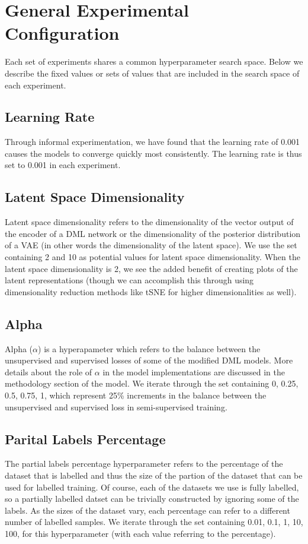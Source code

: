 \documentclass[./dissertation.tex]{subfiles}
\begin{document}
    
    
    \section{General Experimental Configuration}
    Each set of experiments shares a common hyperparameter search space. Below we describe the fixed values or sets of values that are included in the search space of each experiment. 
    \subsection{Learning Rate}
    Through informal experimentation, we have found that the learning rate of 0.001 causes the models to converge quickly most consistently. The learning rate is thus set to 0.001 in each experiment.
    \subsection{Latent Space Dimensionality}
    Latent space dimensionality refers to the dimensionality of the vector output of the encoder of a DML network or the dimensionality of the posterior distribution of a VAE (in other words the dimensionality of the latent space). We use the set containing 2 and 10 as potential values for latent space dimensionality. When the latent space dimensionality is 2, we see the added benefit of creating plots of the latent representations (though we can accomplish this through using dimensionality reduction methods like tSNE for higher dimensionalities as well).
    \subsection{Alpha}
    Alpha ($\alpha$) is a hyperapameter which refers to the balance between the unsupervised and supervised losses of some of the modified DML models. More details about the role of $\alpha$ in the model implementations are discussed in the methodology section of the model. We iterate through the set containing 0, 0.25, 0.5, 0.75, 1, which represent 25\% increments in the balance between the unsupervised and supervised loss in semi-supervised training. 
    \subsection{Parital Labels Percentage}
    The partial labels percentage hyperparameter refers to the percentage of the dataset that is labelled and thus the size of the partion of the dataset that can be used for labelled training. Of course, each of the datasets we use is fully labelled, so a partially labelled datset can be trivially constructed by ignoring some of the labels. As the sizes of the dataset vary, each percentage can refer to a different number of labelled samples. We iterate through the set containing 0.01, 0.1, 1, 10, 100, for this hyperparameter (with each value referring to the percentage). 
\end{document}
